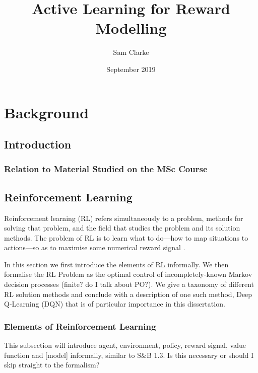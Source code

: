 \documentclass[11pt, a4paper, bibliography=totoc]{report}
\begin{document}
\title{Active Learning for Reward Modelling}
\author{Sam Clarke}
\date{September 2019}
\renewcommand{\bibname}{References}
\maketitle

\begin{abstract} %

\end{abstract}

\tableofcontents

\part{Background}

\chapter{Introduction}

\section{Relation to Material Studied on the MSc Course}

\chapter{Reinforcement Learning} %
Reinforcement learning (RL) refers simultaneously to a problem, methods for solving that problem, and the field that studies the problem and its solution methods. The problem of RL is to learn what to do---how to map situations to actions---so as to maximise some numerical reward signal \cite[pp.~1-2]{Sutton2018}.

In this section we first introduce the elements of RL informally. We then formalise the RL Problem as the optimal control of incompletely-known Markov decision processes (finite? do I talk about PO?). We give a taxonomy of different RL solution methods and conclude with a description of one such method, Deep Q-Learning (DQN) that is of particular importance in this dissertation.

\section{Elements of Reinforcement Learning}
This subsection will introduce agent, environment, policy, reward signal, value function and [model] informally, similar to S\&B 1.3. Is this necessary or should I skip straight to the formalism?
\end{document}
